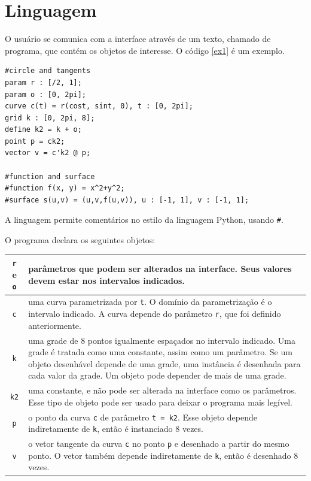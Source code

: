 \chapter{Linguagem}
\label{lang}

O usuário se comunica com a interface através de um texto, chamado de programa,
que contém os objetos de interesse.
O código \ref{ex1} é um exemplo.
\begin{lstlisting}[caption=Exemplo de objetos,label=ex1]
#circle and tangents
param r : [/2, 1];
param o : [0, 2pi];
curve c(t) = r(cost, sint, 0), t : [0, 2pi];
grid k : [0, 2pi, 8];
define k2 = k + o;
point p = ck2;
vector v = c'k2 @ p;

#function and surface
#function f(x, y) = x^2+y^2;
#surface s(u,v) = (u,v,f(u,v)), u : [-1, 1], v : [-1, 1];
\end{lstlisting}

A linguagem permite comentários no estilo da linguagem Python, usando \texttt{\#}.

O programa declara os seguintes objetos:

\begin{centering}
\begin{tabularx}{\textwidth}{||c|X||}
    \hline
    \texttt{r} e \texttt{o} & parâmetros que podem ser alterados na interface.
    Seus valores devem estar nos intervalos indicados. \\ 

    \hline
    \texttt{c} & uma curva parametrizada por \texttt{t}.
    O domínio da parametrização é o intervalo indicado.
    A curva depende do parâmetro \texttt{r}, que foi definido anteriormente. \\

    \hline
    \texttt{k} & uma grade de 8 pontos igualmente espaçados no intervalo indicado.
    Uma grade é tratada como uma constante, assim como um parâmetro.
    Se um objeto desenhável depende de uma grade, uma instância é desenhada para cada valor da grade.
    Um objeto pode depender de mais de uma grade. \\

    \hline
    \texttt{k2} & uma constante, e não pode ser alterada na interface como os parâmetros.
    Esse tipo de objeto pode ser usado para deixar o programa mais legível. \\
    
    \hline
    \texttt{p} & o ponto da curva \texttt{c} de parâmetro \texttt{t = k2}.
    Esse objeto depende indiretamente de \texttt{k}, então é instanciado 8 vezes. \\
    
    \hline
    \texttt{v} & o vetor tangente da curva \texttt{c} no ponto \texttt{p} 
    e desenhado a partir do mesmo ponto.
    O vetor também depende indiretamente de \texttt{k}, então é desenhado 8 vezes. \\
    \hline
\end{tabularx}
\end{centering}

